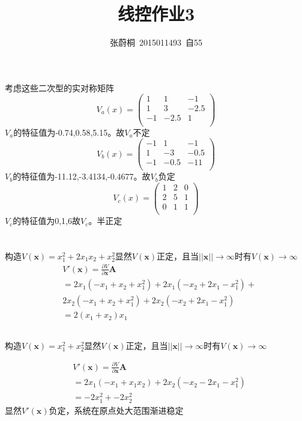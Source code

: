 \documentclass[UTF8,a4paper]{ctexart}
\title{线控作业3}
\author{张蔚桐\ 2015011493\ 自55}
\begin{document}
\maketitle
\section{}
考虑这些二次型的实对称矩阵
$$V_a(x)=\begin{pmatrix}
1& 1 & -1 \\
1& 3 & -2.5\\
-1& -2.5 & 1\\
\end{pmatrix}$$
$V_a$的特征值为-0.74,0.58,5.15。故$V_a$不定
$$V_b(x)=\begin{pmatrix}
-1& 1 & -1 \\
1& -3 & -0.5\\
-1& -0.5 & -11\\
\end{pmatrix}$$
$V_b$的特征值为-11.12,-3.4134,-0.4677。故$V_b$负定
$$V_c(x)=\begin{pmatrix}
1& 2 & 0 \\
2& 5 & 1\\
0& 1 & 1\\
\end{pmatrix}$$
$V_c$的特征值为0,1,6故$V_c$。半正定
\section{}
\subsection{}
构造$V(\mathbf{x})=x_1^2+2x_1x_2+x_2^2$显然$V(\mathbf{x})$正定，且当$\left|\left|\mathbf{x}\right|\right| \rightarrow \infty$时有$V(\mathbf{x}) \rightarrow \infty$
\begin{equation}\begin{aligned}
&V'(\mathbf{x})=\frac{\partial V}{\partial \mathbf{x}}\mathbf{A}\\& =2x_1(-x_1+x_2+x_1^2)+2x_1(-x_2+2x_1-x_1^2)+\\&2x_2(-x_1+x_2+x_1^2)+2x_2(-x_2+2x_1-x_1^2)\\& =2(x_1+x_2)x_1\end{aligned}\end{equation}
\subsection{}
构造$V(\mathbf{x})=x_1^2+x_2^2$显然$V(\mathbf{x})$正定，且当$\left|\left|\mathbf{x}\right|\right| \rightarrow \infty$时有$V(\mathbf{x}) \rightarrow \infty$

\begin{equation}\begin{aligned}
&V'(\mathbf{x})=\frac{\partial V}{\partial \mathbf{x}}\mathbf{A}\\& =2x_1(-x_1+x_1x_2)+2x_2(-x_2-2x_1-x_1^2)\\& =-2x_1^2+-2x_2^2\end{aligned}\end{equation}
显然$V'(\mathbf{x})$负定，系统在原点处大范围渐进稳定
\section{}
\end{document}

